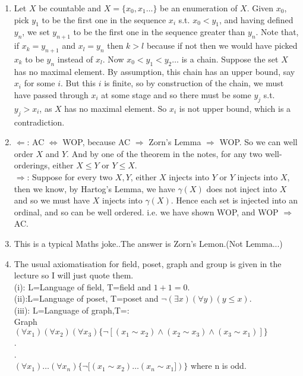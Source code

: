\begin{enumerate}
\item Let $X$ be countable and $X=\{x_0,x_1 \ldots\}$ be an enumeration of $X$. Given $x_0$, pick $y_1$ to be the first one in the sequence $x_i$ s.t. $x_0 < y_1$, and having defined $y_n$, we set $y_{n+1}$ to be the first one in the sequence greater than $y_n$. Note that, if $x_k=y_{n+1}$ and $x_l=y_n$ then $k>l$ because if not then we would have picked $x_k$ to be $y_n$ instead of $x_l$. Now $x_0 < y_1 < y_2 \ldots$ is a chain. Suppose the set $X$ has no maximal element. By assumption, this chain has an upper bound, say $x_i$ for some $i$. But this $i$ is finite, so by construction of the chain, we must have passed through $x_i$ at some stage and so there must be some $y_j$ s.t. $y_j > x_i$, as $X$ has no maximal element. So $x_i$ is not upper bound, which is a contradiction.\\
\item $\Leftarrow$: AC $\iff$ WOP, because AC $\Rightarrow$ Zorn's Lemma $\Rightarrow$ WOP. So we can well order $X$ and $Y$. And by one of the theorem in the notes, for any two well-orderings, either $X \le Y$ or $Y \le X$.\\
    $\Rightarrow$: Suppose for every two $X,Y$, either $X$ injects into $Y$ or $Y$ injects into $X$, then we know, by Hartog's Lemma, we have $\gamma(X)$ does not inject into $X$ and so we must have $X$ injects into $\gamma(X)$. Hence each set is injected into an ordinal, and so can be well ordered. i.e. we have shown WOP, and WOP $\Rightarrow$ AC.\\
\item This is a typical Maths joke..The answer is Zorn's Lemon.(Not Lemma...)\\
\item The usual axiomatisation for field, poset, graph and group is given in the lecture so I will just quote them.\\
    (i): L=Language of field, T=field and $1+1=0$.\\
    (ii):L=Language of poset, T=poset and $\neg(\exists x)(\forall y)(y \le x)$.\\
    (iii): L=Language of graph,T=:\\
     Graph\\
     $(\forall x_1)(\forall x_2)(\forall x_3)\{\neg [(x_1 \sim x_2) \wedge (x_2 \sim x_3) \wedge (x_3 \sim x_1)]\}$\\
     .\\
     .\\
     $(\forall x_1) \ldots (\forall x_n)\{\neg[(x_1 \sim x_2) \ldots (x_n \sim x_1])\}$ where n is odd.\\

\end{enumerate}
